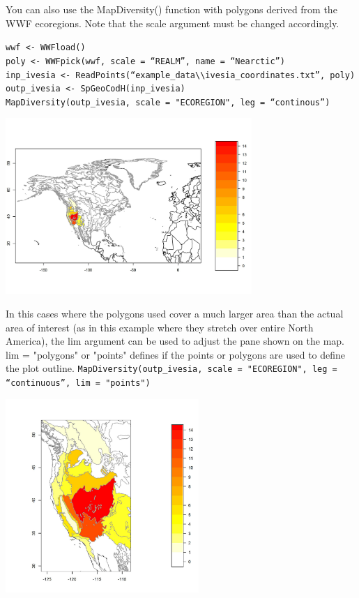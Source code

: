 \documentclass[a4paper,titlepage,11pt]{scrreprt}
\begin{document}
You can also use the MapDiversity() function with polygons derived from the WWF ecoregions. Note that the scale argument must be changed accordingly. 

\texttt{wwf \textless- WWFload()}\\
\texttt{poly \textless- WWFpick(wwf, scale = ``REALM'', name  = ``Nearctic'')}\\
\texttt{inp\_ivesia  \textless- ReadPoints(``example\_data\textbackslash \textbackslash ivesia\_coordinates.txt'', poly)}\\
\texttt{outp\_ivesia \textless- SpGeoCodH(inp\_ivesia)}\\
\texttt{MapDiversity(outp\_ivesia, scale = "ECOREGION", leg = ``continous'')}\\

\begin{center}
\includegraphics[width=0.7\textwidth]{figures/mapdiversity_ecoregions_polygons.jpeg}\\
\end{center}

In this cases where the polygons used cover a much larger area than the actual area of interest (as in this example where they stretch over entire North America), the lim argument can be used to adjust the pane shown on the map. lim = "polygons" or "points" defines if the points or polygons are used to define the plot outline.
\texttt{MapDiversity(outp\_ivesia, scale = "ECOREGION", leg = ``continuous'', lim = "points")}\\

\begin{center}
\includegraphics[width=0.55\textwidth]{figures/mapdiversity_ecoregions_points.jpg}\\
\end{center}
\end{document}
